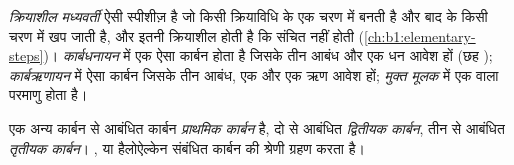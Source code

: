 \begin{definition}[क्रियाशील मध्यवर्ती]\label{def:b1:electronic-effects:intermediates}
\emph{क्रियाशील मध्यवर्ती} ऐसी स्पीशीज़ है जो
किसी क्रियाविधि के एक चरण में बनती है और बाद के किसी चरण में खप जाती है, और इतनी
क्रियाशील होती है कि संचित नहीं होती (\cref{ch:b1:elementary-steps})।
\emph{कार्बधनायन} में एक ऐसा कार्बन होता है जिसके तीन आबंध और एक
धन आवेश हों (छह );
\emph{कार्बऋणायन} में ऐसा कार्बन जिसके तीन आबंध, एक 
और एक ऋण आवेश हों; \emph{मुक्त मूलक} में एक
 वाला परमाणु होता है।
\end{definition}

\begin{definition}[कार्बन की श्रेणी]\label{def:b1:electronic-effects:carbon-class}
एक अन्य कार्बन से आबंधित कार्बन \emph{प्राथमिक
कार्बन} है, दो से आबंधित \emph{द्वितीयक
कार्बन}, तीन से आबंधित \emph{तृतीयक
कार्बन}। ,  या
हैलोऐल्केन संबंधित कार्बन की श्रेणी ग्रहण करता है।
\end{definition}

